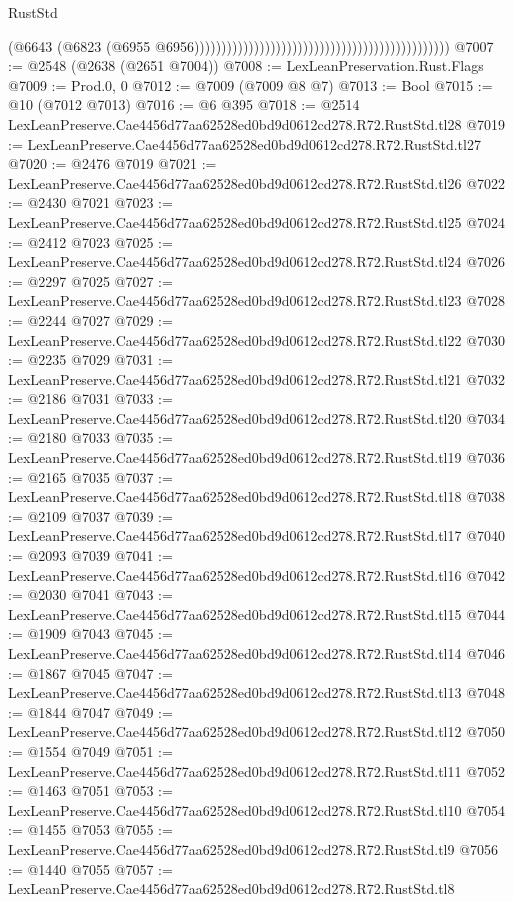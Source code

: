\begin{lexlean}{RustStd}
\begin{coremodule}
                                                                                            (@6643
                                                                                              (@6823
                                                                                                (@6955
                                                                                                  @6956)))))))))))))))))))))))))))))))))))))))))))))))
@7007 := @2548 (@2638 (@2651 @7004))
@7008 := LexLeanPreservation.Rust.Flags
@7009 := Prod.{0, 0}
@7012 := @7009 (@7009 @8 @7)
@7013 := Bool
@7015 := @10 (@7012 @7013)
@7016 := @6 @395
@7018 := @2514 LexLeanPreserve.Cae4456d77aa62528ed0bd9d0612cd278.R72.RustStd.tl28
@7019 := LexLeanPreserve.Cae4456d77aa62528ed0bd9d0612cd278.R72.RustStd.tl27
@7020 := @2476 @7019
@7021 := LexLeanPreserve.Cae4456d77aa62528ed0bd9d0612cd278.R72.RustStd.tl26
@7022 := @2430 @7021
@7023 := LexLeanPreserve.Cae4456d77aa62528ed0bd9d0612cd278.R72.RustStd.tl25
@7024 := @2412 @7023
@7025 := LexLeanPreserve.Cae4456d77aa62528ed0bd9d0612cd278.R72.RustStd.tl24
@7026 := @2297 @7025
@7027 := LexLeanPreserve.Cae4456d77aa62528ed0bd9d0612cd278.R72.RustStd.tl23
@7028 := @2244 @7027
@7029 := LexLeanPreserve.Cae4456d77aa62528ed0bd9d0612cd278.R72.RustStd.tl22
@7030 := @2235 @7029
@7031 := LexLeanPreserve.Cae4456d77aa62528ed0bd9d0612cd278.R72.RustStd.tl21
@7032 := @2186 @7031
@7033 := LexLeanPreserve.Cae4456d77aa62528ed0bd9d0612cd278.R72.RustStd.tl20
@7034 := @2180 @7033
@7035 := LexLeanPreserve.Cae4456d77aa62528ed0bd9d0612cd278.R72.RustStd.tl19
@7036 := @2165 @7035
@7037 := LexLeanPreserve.Cae4456d77aa62528ed0bd9d0612cd278.R72.RustStd.tl18
@7038 := @2109 @7037
@7039 := LexLeanPreserve.Cae4456d77aa62528ed0bd9d0612cd278.R72.RustStd.tl17
@7040 := @2093 @7039
@7041 := LexLeanPreserve.Cae4456d77aa62528ed0bd9d0612cd278.R72.RustStd.tl16
@7042 := @2030 @7041
@7043 := LexLeanPreserve.Cae4456d77aa62528ed0bd9d0612cd278.R72.RustStd.tl15
@7044 := @1909 @7043
@7045 := LexLeanPreserve.Cae4456d77aa62528ed0bd9d0612cd278.R72.RustStd.tl14
@7046 := @1867 @7045
@7047 := LexLeanPreserve.Cae4456d77aa62528ed0bd9d0612cd278.R72.RustStd.tl13
@7048 := @1844 @7047
@7049 := LexLeanPreserve.Cae4456d77aa62528ed0bd9d0612cd278.R72.RustStd.tl12
@7050 := @1554 @7049
@7051 := LexLeanPreserve.Cae4456d77aa62528ed0bd9d0612cd278.R72.RustStd.tl11
@7052 := @1463 @7051
@7053 := LexLeanPreserve.Cae4456d77aa62528ed0bd9d0612cd278.R72.RustStd.tl10
@7054 := @1455 @7053
@7055 := LexLeanPreserve.Cae4456d77aa62528ed0bd9d0612cd278.R72.RustStd.tl9
@7056 := @1440 @7055
@7057 := LexLeanPreserve.Cae4456d77aa62528ed0bd9d0612cd278.R72.RustStd.tl8

\end{coremodule}
\end{lexlean}
